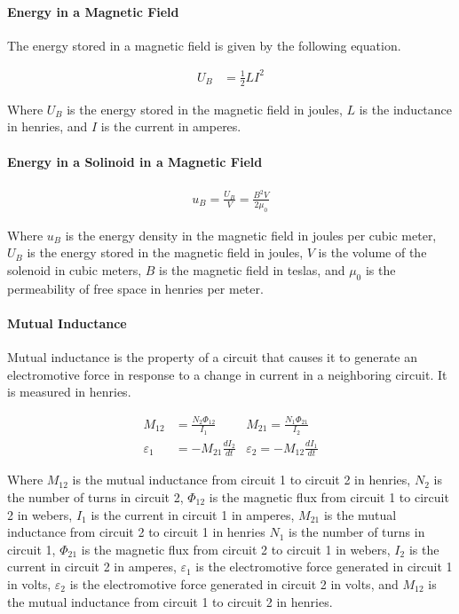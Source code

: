 \paragraph*{Energy in a Magnetic Field}
The energy stored in a magnetic field is given by the following equation.

\begin{align*}
    U_B &= \frac{1}{2}LI^2
\end{align*}

Where $U_B$ is the energy stored in the magnetic field in joules, $L$ is the inductance in henries, and $I$ is the current in amperes.\\

\paragraph*{Energy in a Solinoid in a Magnetic Field}
\begin{align*}
    u_B = \frac{U_B}{V} = \frac{B^2V}{2\mu_0}
\end{align*}

Where $u_B$ is the energy density in the magnetic field in joules per cubic meter, $U_B$ is the energy stored in the magnetic field in joules, 
$V$ is the volume of the solenoid in cubic meters, $B$ is the magnetic field in teslas, and $\mu_0$ is the permeability of free space in henries per meter.\\


\paragraph*{Mutual Inductance}
Mutual inductance is the property of a circuit that causes it to generate an electromotive force in response to a change in current in a
neighboring circuit. It is measured in henries. 


\begin{align*}
    M_{12} &= \frac{N_2\Phi_12}{I_1} &M_{21} = \frac{N_1\Phi_21}{I_2}\\
    \varepsilon_1 &= -M_{21}\frac{dI_2}{dt} &\varepsilon_2 = -M_{12} \frac{dI_1}{dt}
\end{align*}

Where $M_{12}$ is the mutual inductance from circuit 1 to circuit 2 in henries, $N_2$ is the number of turns in circuit 2, $\Phi_{12}$ is the magnetic flux
from circuit 1 to circuit 2 in webers, $I_1$ is the current in circuit 1 in amperes, $M_{21}$ is the mutual inductance from circuit 2 to circuit 1 in henries
$N_1$ is the number of turns in circuit 1, $\Phi_{21}$ is the magnetic flux from circuit 2 to circuit 1 in webers, $I_2$ is the current in circuit 2 in
amperes, $\varepsilon_1$ is the electromotive force generated in circuit 1 in volts, $\varepsilon_2$ is the electromotive force generated in circuit 2 in
volts, and $M_{12}$ is the mutual inductance from circuit 1 to circuit 2 in henries.\\


